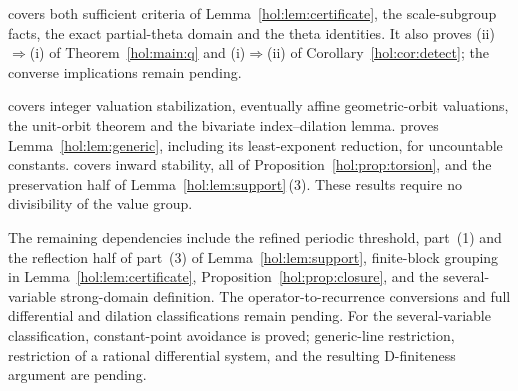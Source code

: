 \documentclass[11pt]{article}
\numberwithin{equation}{section}
\theoremstyle{definition}
\theoremstyle{remark}
\begin{document}
 covers both sufficient
criteria of Lemma~\ref{hol:lem:certificate}, the scale-subgroup facts,
the exact partial-theta domain and the theta identities. It also proves
\textup{(ii)}$\Rightarrow$\textup{(i)} of Theorem~\ref{hol:main:q}
and \textup{(i)}$\Rightarrow$\textup{(ii)} of
Corollary~\ref{hol:cor:detect}; the converse implications remain pending.

 covers integer
valuation stabilization, eventually affine geometric-orbit valuations,
the unit-orbit theorem and the bivariate index--dilation lemma.
 proves
Lemma~\ref{hol:lem:generic}, including its least-exponent reduction, for
uncountable constants. 
covers inward stability, all of Proposition~\ref{hol:prop:torsion},
and the preservation half of Lemma~\ref{hol:lem:support}\,(3).
These results require no divisibility of the value group.

The remaining dependencies include the refined periodic threshold,
part~(1) and the reflection half of part~(3) of
Lemma~\ref{hol:lem:support}, finite-block grouping in
Lemma~\ref{hol:lem:certificate}, Proposition~\ref{hol:prop:closure},
and the several-variable strong-domain definition. The operator-to-recurrence
conversions and full differential and dilation classifications remain
pending. For the several-variable classification, constant-point avoidance
is proved; generic-line restriction, restriction of a rational
differential system, and the resulting D-finiteness argument are pending.
\end{document}
